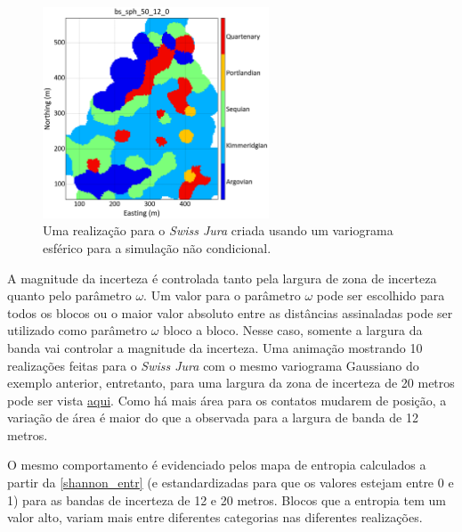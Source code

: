 \begin{figure}[H]
	\caption{\label{sph_jura} Uma realização para o \textit{Swiss Jura} criada usando um variograma esférico para a simulação não condicional.}
	\centering
		\includegraphics[width=0.6\textwidth]{capitulo_3/imagens/sph_real_0_50_12.png}
\end{figure}

A magnitude da incerteza é controlada tanto pela largura de zona de incerteza quanto pelo parâmetro $\omega$. Um valor para o parâmetro $\omega$ pode ser escolhido para todos os blocos ou o maior valor absoluto entre as distâncias assinaladas pode ser utilizado como parâmetro $\omega$ bloco a bloco. Nesse caso, somente a largura da banda vai controlar a magnitude da incerteza. Uma animação mostrando 10 realizações feitas para o \textit{Swiss Jura} com o mesmo variograma Gaussiano do exemplo anterior, entretanto, para uma largura da zona de incerteza de 20 metros pode ser vista \href{https://github.com/robertorolo/assessing_geological_model_uncertainty_with_probability_fields/blob/main/ezgif-2-721b458d5c70.gif}{aqui}. Como há mais área para os contatos mudarem de posição, a variação de área é maior do que a observada para a largura de banda de 12 metros. 

O mesmo comportamento é evidenciado pelos mapa de entropia calculados a partir da \autoref{shannon_entr} (e estandardizadas para que os valores estejam entre 0 e 1) para as bandas de incerteza de 12 e 20 metros. Blocos que a entropia tem um valor alto, variam mais entre diferentes categorias nas diferentes realizações. 


